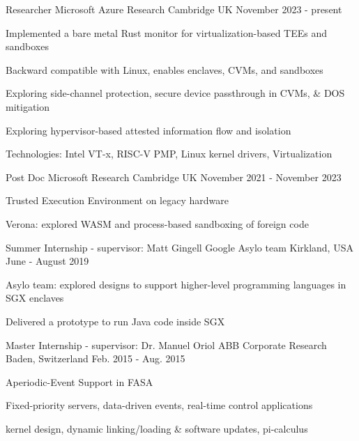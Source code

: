 


\begin{cventries}


\cventry
{Researcher}
{Microsoft Azure Research}
{Cambridge UK}
{November 2023 - present}
{
  \begin{cvitems}
  \item{Implemented a bare metal Rust monitor for virtualization-based TEEs and sandboxes}
  \item{Backward compatible with Linux, enables enclaves, CVMs, and sandboxes}
  \item{Exploring side-channel protection, secure device passthrough in CVMs, \& DOS mitigation}
  \item{Exploring hypervisor-based attested information flow and isolation}
  \item{Technologies: Intel VT-x, RISC-V PMP, Linux kernel drivers, Virtualization}
  \end{cvitems}
}

\cventry
{Post Doc}
{Microsoft Research}
{Cambridge UK}
{November 2021 - November 2023}
{
  \begin{cvitems}
  \item{Trusted Execution Environment on legacy hardware}
  \item{Verona: explored WASM and process-based sandboxing of foreign code}
  \end{cvitems}
}

\cventry
{Summer Internship - supervisor: Matt Gingell}
{Google Asylo team}
{Kirkland, USA}
{June - August 2019}
{ 
  \begin{cvitems}
	\item{Asylo team: explored designs to support higher-level programming languages in SGX enclaves}
  \item{Delivered a prototype to run Java code inside SGX}
	\end{cvitems}
}

\cventry
{Master Internship - supervisor: Dr. Manuel Oriol}
{ABB Corporate Research}
{Baden, Switzerland}
{Feb. 2015 - Aug. 2015}
{
	\begin{cvitems}
  \item{Aperiodic-Event Support in FASA}
  \item{Fixed-priority servers, data-driven events, real-time control applications}
  \item{kernel design, dynamic linking/loading \& software updates, pi-calculus}
	\end{cvitems}
}

\end{cventries}
